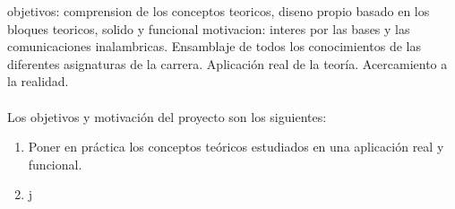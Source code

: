 objetivos: comprension de los conceptos teoricos, diseno propio basado en los bloques teoricos, solido y funcional 
motivacion: interes por las bases y las comunicaciones inalambricas.
Ensamblaje de todos los conocimientos de las diferentes asignaturas de la carrera.
Aplicación real de la teoría. Acercamiento a la realidad.

\paragraph{}
Los objetivos y motivación del proyecto son los siguientes:
\begin{enumerate}
\item Poner en práctica los conceptos teóricos estudiados en una aplicaci\'on real y funcional.
\item j
\end{enumerate}
